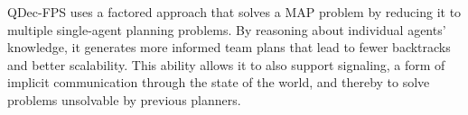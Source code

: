 \documentclass[letterpaper]{article} %
\theoremstyle{definition}
\begin{document}
QDec-FPS uses a
 factored approach that solves a MAP problem
 by reducing it to multiple single-agent planning problems. By
reasoning about individual agents' knowledge, it generates more informed team plans that
lead to fewer backtracks and better scalability. This ability
allows it to also
support signaling, a form of
implicit communication
through the state of the world,
and thereby to solve
problems unsolvable by previous planners.
\end{document}
